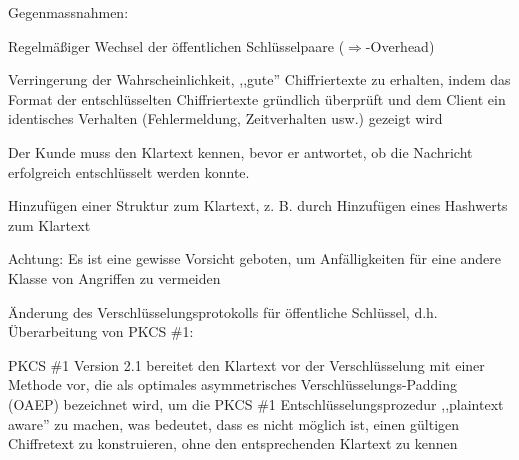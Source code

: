 \documentclass[a4paper]{article}
\begin{document}
\begin{multicols}{3}
\begin{itemize*}
            \item Gegenmassnahmen:
            \begin{itemize*}
                  \item Regelmäßiger Wechsel der öffentlichen Schlüsselpaare ($\Rightarrow$-Overhead)
                  \item Verringerung der Wahrscheinlichkeit, ,,gute'' Chiffriertexte zu erhalten, indem das Format der entschlüsselten Chiffriertexte gründlich überprüft und dem Client ein identisches Verhalten (Fehlermeldung, Zeitverhalten usw.) gezeigt wird
                  \item Der Kunde muss den Klartext kennen, bevor er antwortet, ob die Nachricht erfolgreich entschlüsselt werden konnte.
                  \item Hinzufügen einer Struktur zum Klartext, z. B. durch Hinzufügen eines Hashwerts zum Klartext
                  \item Achtung: Es ist eine gewisse Vorsicht geboten, um Anfälligkeiten für eine andere Klasse von Angriffen zu vermeiden
                  \item Änderung des Verschlüsselungsprotokolls für öffentliche Schlüssel, d.h. Überarbeitung von PKCS \#1:
                  \begin{itemize*}
                        \item PKCS \#1 Version 2.1 bereitet den Klartext vor der Verschlüsselung mit einer Methode vor, die als optimales asymmetrisches Verschlüsselungs-Padding (OAEP) bezeichnet wird, um die PKCS \#1 Entschlüsselungsprozedur ,,plaintext aware'' zu machen, was bedeutet, dass es nicht möglich ist, einen gültigen Chiffretext zu konstruieren, ohne den entsprechenden Klartext zu kennen
                  \end{itemize*}
            \end{itemize*}
      \end{itemize*}


\end{multicols}
\end{document}
